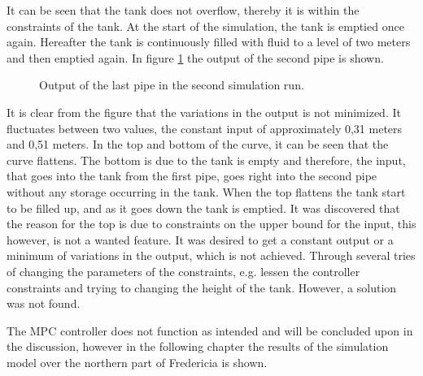 It can be seen that the tank does not overflow, thereby it is within the constraints of the tank. At the start of the simulation, the tank is emptied once again. Hereafter the tank is continuously filled with fluid to a level of two meters and then emptied again. In figure \ref{fig:MPC_test_output_second_test_with_constraints} the output of the second pipe is shown. 

\begin{figure}[H]
 \centering
 
\caption{Output of the last pipe in the second simulation run.}
\label{fig:MPC_test_output_second_test_with_constraints}
\end{figure}

It is clear from the figure that the variations in the output is not minimized. It fluctuates between two values, the constant input of approximately 0,31 meters and 0,51 meters. In the top and bottom of the curve, it can be seen that the curve flattens. The bottom is due to the tank is empty and therefore, the input, that goes into the tank from the first pipe, goes right into the second pipe without any storage occurring in the tank. When the top flattens the tank start to be filled up, and as it goes down the tank is emptied. It was discovered that the reason for the top is due to constraints on the upper bound for the input, this however, is not a wanted feature. It was desired to get a constant output or a minimum of variations in the output, which is not achieved. Through several tries of changing the parameters of the constraints, e.g. lessen the controller constraints and trying to changing the height of the tank. However, a solution was not found.

The MPC controller does not function as intended and will be concluded upon in the discussion, however in the following chapter the results of the simulation model over the northern part of Fredericia is shown.







